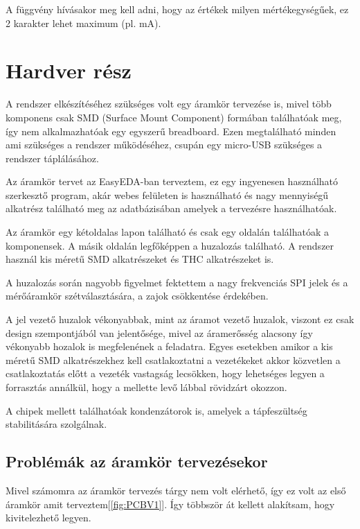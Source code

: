 A függvény hívásakor meg kell adni, hogy az értékek milyen mértékegységűek, ez 2
karakter lehet maximum (pl. mA). 





\section{Hardver rész}

A rendszer elkészítéséhez szükséges volt egy áramkör tervezése is, mivel több komponens
csak SMD (Surface Mount Component) formában találhatóak meg, így nem alkalmazhatóak egy
egyszerű breadboard. Ezen megtalálható minden ami szükséges a rendszer működéséhez, 
csupán egy micro-USB szükséges a rendszer táplálásához.

Az áramkör tervet az EasyEDA-ban terveztem, ez egy ingyenesen használható szerkesztő
program, akár webes felületen is használható és nagy mennyiségű alkatrész található
meg az adatbázisában amelyek a tervezésre használhatóak.

Az áramkör egy kétoldalas lapon található és csak egy oldalán találhatóak a komponensek.
A másik oldalán legfőképpen a huzalozás található. A rendszer használ kis méretű
SMD alkatrészeket és THC alkatrészeket is. 

A huzalozás során nagyobb figyelmet fektettem a nagy frekvenciás SPI jelek
és a mérőáramkör szétválasztására, a zajok csökkentése érdekében.

A jel vezető huzalok vékonyabbak, mint az áramot vezető huzalok, viszont ez csak
design szempontjából van jelentősége, mivel az áramerősség alacsony így vékonyabb
hozalok is megfelenének a feladatra. Egyes esetekben amikor a kis méretű SMD 
alkatrészekhez kell csatlakoztatni a vezetékeket akkor közvetlen a csatlakoztatás
előtt a vezeték vastagság lecsökken, hogy lehetséges legyen a forrasztás annálkül,
hogy a mellette levő lábbal rövidzárt okozzon.

A chipek mellett találhatóak kondenzátorok is, amelyek a tápfeszültség stabilitására
szolgálnak.

\subsection{Problémák az áramkör tervezésekor}

Mivel számomra az áramkör tervezés tárgy nem volt elérhető, így ez volt az első 
áramkör amit terveztem[\ref{fig:PCBV1}]. Így többször át kellett alakítsam, hogy kivitelezhető legyen.

